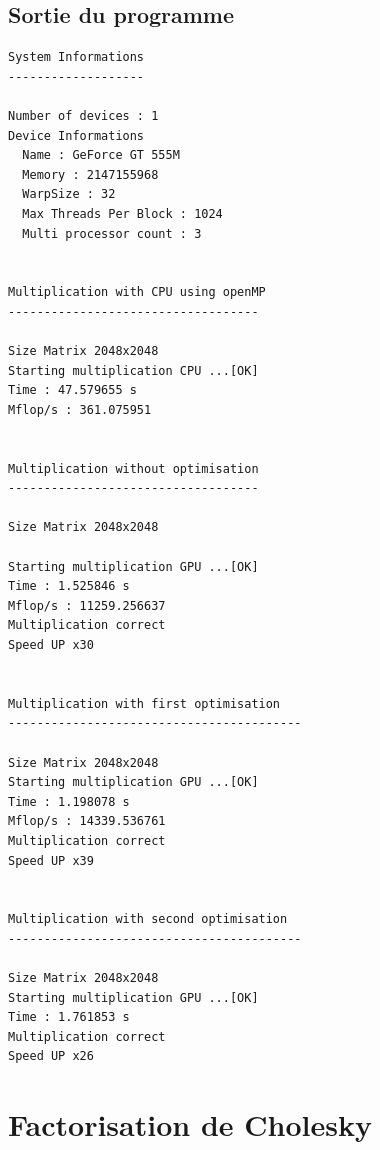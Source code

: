 \documentclass[paper=a4, fontsize=11pt]{scrartcl} %
\numberwithin{equation}{section} %
\numberwithin{figure}{section} %
\numberwithin{table}{section} %
\begin{document}
\subsection{Sortie du programme}
\begin{verbatim}
System Informations
-------------------

Number of devices : 1
Device Informations
  Name : GeForce GT 555M
  Memory : 2147155968
  WarpSize : 32
  Max Threads Per Block : 1024
  Multi processor count : 3


Multiplication with CPU using openMP
-----------------------------------

Size Matrix 2048x2048
Starting multiplication CPU ...[OK]
Time : 47.579655 s
Mflop/s : 361.075951 


Multiplication without optimisation
-----------------------------------

Size Matrix 2048x2048

Starting multiplication GPU ...[OK]
Time : 1.525846 s
Mflop/s : 11259.256637 
Multiplication correct
Speed UP x30


Multiplication with first optimisation
-----------------------------------------

Size Matrix 2048x2048
Starting multiplication GPU ...[OK]
Time : 1.198078 s
Mflop/s : 14339.536761 
Multiplication correct
Speed UP x39


Multiplication with second optimisation
-----------------------------------------

Size Matrix 2048x2048
Starting multiplication GPU ...[OK]
Time : 1.761853 s
Multiplication correct
Speed UP x26
\end{verbatim}



\section{Factorisation de Cholesky}
\end{document}
